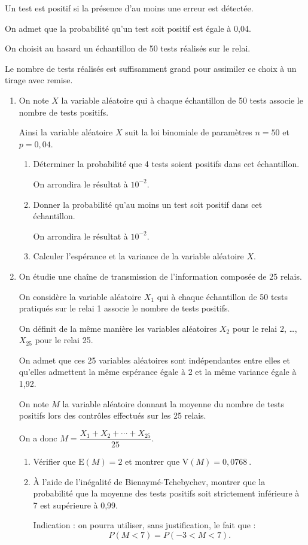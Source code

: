 \documentclass[10pt]{article}
\providecommand{\np}[2][]{{#2~#1}}
\begin{document}
		Un test est positif si la présence d'au moins une erreur est détectée.

		On admet que la probabilité qu'un test soit positif est égale à 0,04.

		On choisit au hasard un échantillon de 50 tests réalisés sur le relai.

		Le nombre de tests réalisés est suffisamment grand pour assimiler ce choix à un tirage avec remise.

		\begin{enumerate}
			\item On note $X$ la variable aléatoire qui à chaque échantillon de 50 tests associe le nombre de tests positifs.

			Ainsi la variable aléatoire $X$ suit la loi binomiale de paramètres $n=50$ et $p=0,04$.

			\begin{enumerate}
				\item Déterminer la probabilité que 4 tests soient positifs dans cet échantillon.

				On arrondira le résultat à $10^{-2}$.

				\item Donner la probabilité qu'au moins un test soit positif dans cet échantillon.

				On arrondira le résultat à $10^{-2}$.
				\item Calculer l'espérance et la variance de la variable aléatoire $X$.
			\end{enumerate}

			\item On étudie une chaîne de transmission de l'information composée de 25 relais.

			On considère la variable aléatoire $X_{1}$ qui à chaque échantillon de 50 tests pratiqués sur le relai 1 associe le nombre de tests positifs.

			On définit de la même manière les variables aléatoires $X_{2}$ pour le relai $2$, \ldots, $X_{25}$ pour le relai 25.

			On admet que ces 25 variables aléatoires sont indépendantes entre elles et qu'elles admettent la même espérance égale à 2 et la même variance égale à 1,92.

			On note $M$ la variable aléatoire donnant la moyenne du nombre de tests positifs lors des contrôles effectués sur les 25 relais.

			On a donc \quad $M=\dfrac{X_{1}+X_{2}+\cdots+X_{25}}{25}$.
			\begin{enumerate}
				\item Vérifier que $\mathrm{E}(M)=2$ et montrer que $\mathrm{V}(M)=\np{0,0768}$.

				\item À l'aide de l'inégalité de Bienaymé-Tchebychev, montrer que la probabilité que la moyenne des tests positifs soit strictement inférieure à 7 est supérieure à 0,99.

				Indication : on pourra utiliser, sans justification, le fait que :
				\[P(M<7)=P(-3<M<7).\]
			\end{enumerate}
		\end{enumerate}
\end{document}
